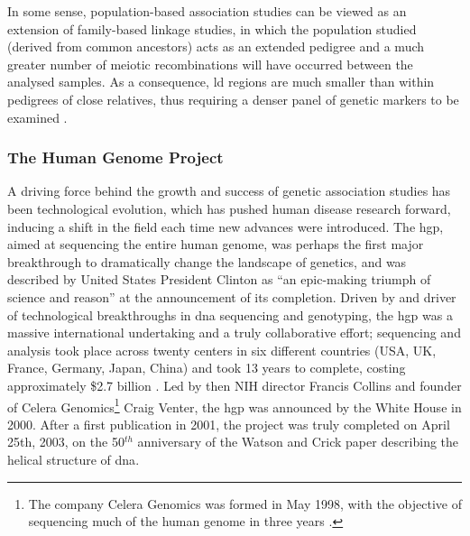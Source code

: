 In some sense, population-based association studies can be viewed as an extension of family-based linkage studies, in which the population studied (derived from common ancestors) acts as an extended pedigree and a much greater number of meiotic recombinations will have occurred between the analysed samples.
As a consequence, \gls{ld} regions are much smaller than within pedigrees of close relatives, thus requiring a denser panel of genetic markers to be examined \cite{cordell2005genetic}.

\subsubsection{The Human Genome Project}

A driving force behind the growth and success of genetic association studies has been technological evolution,
which has
pushed human disease research forward, inducing a shift in the field each time new advances were introduced. 
The \gls{hgp}, aimed at sequencing the entire human genome, was perhaps the first major breakthrough to dramatically change the landscape of genetics, and was described by United States President Clinton as “an epic-making triumph of science and reason” \cite{clinton2000remarks} at the announcement of its completion.
Driven by and driver of technological breakthroughs in \gls{dna} sequencing and genotyping, the \gls{hgp} was a massive international undertaking and a truly collaborative effort; sequencing and analysis took place across twenty centers in six different countries (USA, UK, France, Germany, Japan, China) and took 13 years to complete, costing approximately \$2.7 billion \cite{lander2011initial}.
Led by then NIH director Francis Collins and founder of Celera Genomics\footnote{The company Celera Genomics was formed in May 1998, with the objective of sequencing much of the human genome in three years
\cite{venter1998shotgun}.} Craig Venter, the \gls{hgp} was announced by the White House in 2000.
After a first publication in 2001, the project was truly completed on April 25th, 2003, on the 50$^{th}$ anniversary of the Watson and Crick paper describing the helical structure of \gls{dna}.\\

